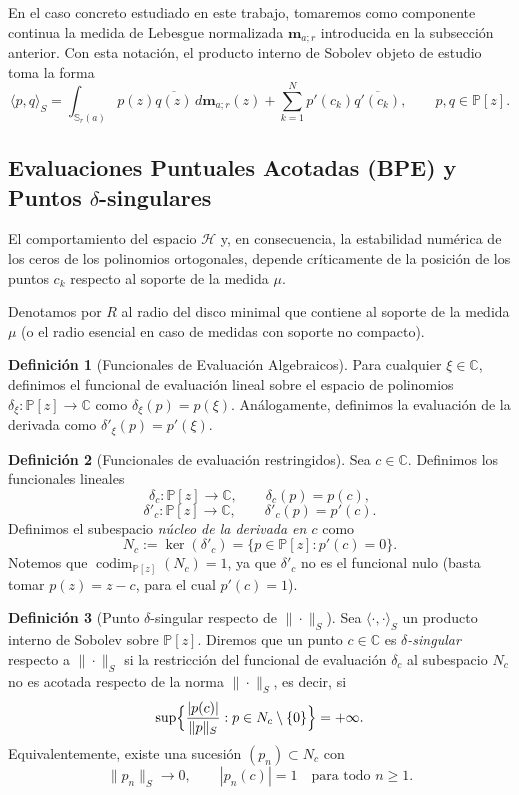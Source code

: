 \documentclass[12pt,a4paper]{article}
\theoremstyle{definition}
\newtheorem{definition}{Definición}
\theoremstyle{remark}
\newcommand{\C}{\mathbb{C}}
\newcommand{\Poly}{\mathbb{P}[z]}
\begin{document}
En el caso concreto estudiado en este trabajo, tomaremos como componente continua la medida de Lebesgue normalizada $\mathbf{m}_{a;r}$ introducida en la subsección anterior. Con esta notación, el producto interno de Sobolev objeto de estudio toma la forma
\begin{equation} \label{eq:sobolev_concreto}
  \langle p, q \rangle_S = \int_{\mathbb{S}_r(a)} p(z)\overline{q(z)} \, d\mathbf{m}_{a;r}(z) + \sum_{k=1}^N p'(c_k)\overline{q'(c_k)}, \qquad p, q \in \Poly.
\end{equation}

\subsection{Evaluaciones Puntuales Acotadas (BPE) y Puntos $\delta$-singulares}

El comportamiento del espacio $\mathcal{H}$ y, en consecuencia, la estabilidad numérica de los ceros de los polinomios ortogonales, depende críticamente de la posición de los puntos $c_k$ respecto al soporte de la medida $\mu$.

Denotamos por $R$ al radio del disco minimal que contiene al soporte de la medida $\mu$ (o el radio esencial en caso de medidas con soporte no compacto).

\begin{definition}[Funcionales de Evaluación Algebraicos]
  Para cualquier $\xi \in \C$, definimos el funcional de evaluación lineal sobre el espacio de polinomios $\delta_\xi : \Poly \to \C$ como $\delta_\xi(p) = p(\xi)$. Análogamente, definimos la evaluación de la derivada como $\delta'_\xi(p) = p'(\xi)$.
\end{definition}

\begin{definition}[Funcionales de evaluación restringidos]\label{def:funcionales_restringidos}
  Sea $c\in\C$. Definimos los funcionales lineales
  \[
    \delta_c:\Poly\to\C,\qquad \delta_c(p)=p(c),
  \]
  \[
    \delta'_c:\Poly\to\C,\qquad \delta'_c(p)=p'(c).
  \]
  Definimos el subespacio \emph{núcleo de la derivada en $c$} como
  \[
    N_c:=\ker(\delta'_c)=\{p\in\Poly:p'(c)=0\}.
  \]
  Notemos que $\operatorname{codim}_{\Poly}(N_c)=1$, ya que $\delta'_c$ no es el funcional nulo
  (basta tomar $p(z)=z-c$, para el cual $p'(c)=1$).
\end{definition}

\begin{definition}[Punto $\delta$-singular respecto de $\|\cdot\|_S$]\label{def:delta_singular}
  Sea $\langle\cdot,\cdot\rangle_S$ un producto interno de Sobolev sobre $\Poly$.
  Diremos que un punto $c\in\C$ es \emph{$\delta$-singular} respecto a
  $\|\cdot\|_S$ si la restricción del funcional de evaluación
  $\delta_c$ al subespacio $N_c$ no es acotada respecto de la norma
  $\|\cdot\|_S$, es decir, si
  \[
    \sup\Bigl\{\frac{|p(c)|}{\|p\|_S}:p\in N_c\setminus\{0\}\Bigr\}
    =+\infty.
  \]
  Equivalentemente, existe una sucesión $(p_n)\subset N_c$ con
  \[
    \|p_n\|_S\to 0,\qquad |p_n(c)|=1\quad\text{para todo }n\ge1.
  \]
\end{definition}
\end{document}
